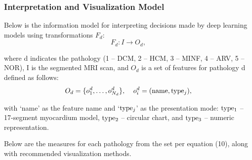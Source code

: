 \documentclass[fleqn,10pt]{wlscirep}
\begin{document}
\subsubsection*{Interpretation and Visualization Model}

Below is the information model for interpreting decisions made by deep learning models using transformations \({F_d}\):
\begin{equation}
    {F_d}:I \to {O_d},
\end{equation}

where d indicates the pathology (1 -- DCM, 2 -- HCM, 3 -- MINF, 4 -- ARV, 5 -- NOR), I is the segmented MRI scan, and \({O_d}\) is a set of features for pathology d defined as follows:
\begin{equation}
    {O_d} = \{ o_1^d, \ldots ,o_{{N_d}}^d\} ,\quad {\kern 1pt} o_i^d = ({\rm{name}},{\rm{typ}}{{\rm{e}}_j}),
\end{equation}

with `name' as the feature name and `\({\rm{typ}}{{\rm{e}}_j}\)' as the presentation mode: \({\rm{typ}}{{\rm{e}}_1}\) -- 17-segment myocardium model, \({\rm{typ}}{{\rm{e}}_2}\) -- circular chart, and \({\rm{typ}}{{\rm{e}}_3}\) -- numeric representation.

Below are the measures for each pathology from the set per equation (10), along with recommended visualization methods.
\end{document}
